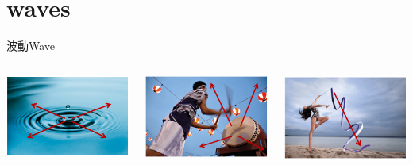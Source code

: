 \documentclass[beamer=true]{standalone}
\begin{document}
\section{waves}
\begin{frame}{波動Wave}
    \begin{columns}
        \par{\par\centering\includegraphics[width=.8\textwidth]{./img/ch1_2024-05-03-21-50-34.png}\par}\bigskip\bigskip
        \par{\par\centering\includegraphics[width=.8\textwidth]{./img/ch1_2024-05-03-21-54-42.png}\par}
        \par{\par\centering\includegraphics[width=.8\textwidth]{./img/ch1_2024-05-03-21-50-54.png}\par}\bigskip\bigskip

\end{columns}
\end{frame}
\end{document}
